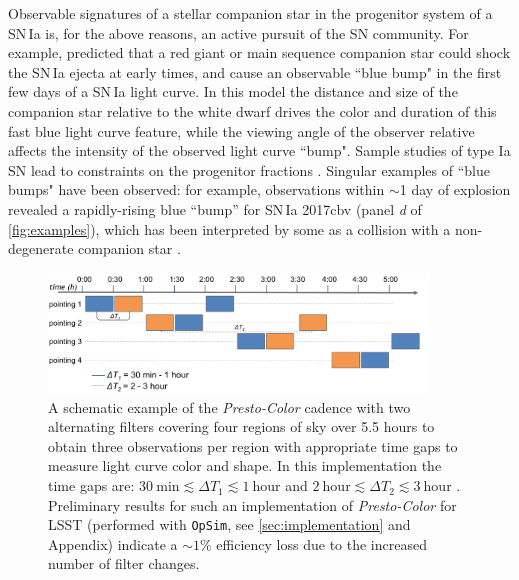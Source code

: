 \documentclass[letterpaper,longauthor,trackchanges,twocolumn,onecolappendix,sort&compress]{aastex62}
\newcommand{\dtone}{\ensuremath{\Delta T_1}}
\newcommand{\dttwo}{\ensuremath{\Delta T_2}}
\begin{document}
Observable signatures of a stellar companion star in the progenitor system of a SN\,Ia is, for the above reasons, an active pursuit of the SN community. For example, \citet{Kasen2010} predicted that a red giant or main sequence companion star could shock the SN\,Ia ejecta at early times, and cause an observable ``blue bump" in the first few days of a SN\,Ia light curve. In this model the distance and size of the companion star relative to the white dwarf drives the color and duration of this fast blue light curve feature, while the viewing angle of the observer relative affects the intensity of the observed light curve ``bump". Sample studies of type Ia SN lead to constraints on the progenitor fractions \citep{Bianco11, Hayden2010}. Singular examples of ``blue bumps" have been observed: for example, observations within $\sim$1 day of explosion revealed a rapidly-rising blue ``bump'' for SN\,Ia 2017cbv (panel \emph{d} of \autoref{fig:examples}), which has been interpreted by some as a collision with a non-degenerate companion star \citep{Hosseinzadeh2017}.

\begin{figure}[!t]
\begin{center}
\includegraphics[width=0.9\textwidth]{figures/cadence_highlevel.png}
\caption{A schematic example of the {\em Presto-Color} cadence with two alternating filters covering four regions of sky over 5.5 hours to obtain three observations per region with appropriate time gaps to measure light curve color and shape. In this implementation the time gaps are: $\mathrm{30~min} \lesssim \dtone\lesssim \mathrm{1~hour}$ and $\mathrm{2~hour} \lesssim \dttwo\lesssim \mathrm{3~hour}$ . Preliminary results for such an implementation of {\em Presto-Color} for LSST (performed with {\tt OpSim}, see \autoref{sec:implementation} and Appendix) indicate a $\sim1\%$ efficiency loss due to the increased number of filter changes.}\label{fig:implementation}
\end{center}
\end{figure}
\end{document}
